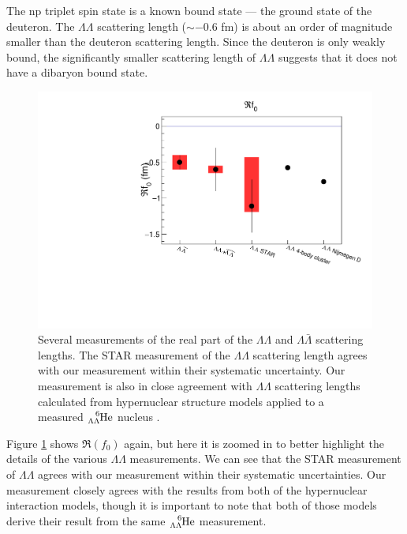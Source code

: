 The np triplet spin state is a known bound state --- the ground state of the deuteron.
 The $\Lambda\Lambda$ scattering length ($\sim-0.6$ fm) is about an order of magnitude smaller than the deuteron scattering length.
Since the deuteron is only weakly bound, the significantly smaller scattering length of $\Lambda\Lambda$ suggests that it does not have a dibaryon bound state.

\begin{figure}[hbtp]
\includegraphics[width=36pc]{Figures/FitResults/2016-9-14-Ref0Zoom.pdf}
\caption[Measurements of $\Re(f_0)$ for various particle pairs (zoomed)]{Several measurements of the real part of the $\Lambda\Lambda$ and $\Lambda\bar{\Lambda}$ scattering lengths. The STAR measurement \cite{Adamczyk:2014vca} of the $\Lambda\Lambda$ scattering length agrees with our measurement within their systematic uncertainty. Our measurement is also in close agreement with $\Lambda\Lambda$ scattering lengths calculated from hypernuclear structure models \cite{ Hiyama:2002yj, Filikhin:2002wm} applied to a measured $\ce{^{6}_{\Lambda\Lambda}\mathrm{He}}$ nucleus \cite{Takahashi:2001nm}.}
\label{fig:Ref0Zoom}
\end{figure}

Figure \ref{fig:Ref0Zoom} shows $\Re(f_0)$ again, but here it is zoomed in to better highlight the details of the various $\Lambda\Lambda$ measurements.
We can see that the STAR measurement of $\Lambda\Lambda$ agrees with our measurement within their systematic uncertainties.
Our measurement closely agrees with the results from both of the hypernuclear interaction models, though it is important to note that both of those models derive their result from the same $\ce{^{6}_{\Lambda\Lambda}\mathrm{He}}$ measurement.




